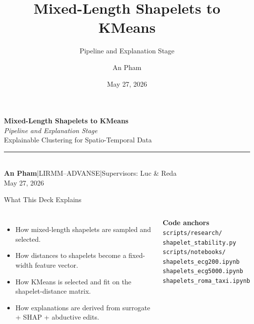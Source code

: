 \documentclass[aspectratio=169]{beamer}
\title{\textbf{Mixed-Length Shapelets to KMeans}}
\subtitle{Pipeline and Explanation Stage}
\author{An Pham}
\institute{LIRMM--ADVANSE, Universit\'e de Montpellier}
\date{May 27, 2026}
\begin{document}
{
\begin{frame}[plain]
\vspace{1.1cm}
{\color{white}\huge\bfseries Mixed-Length Shapelets to KMeans}\\[5pt]
{\color{cteal}\large\itshape Pipeline and Explanation Stage}\\[8pt]
{\color{caccent}\small Explainable Clustering for Spatio-Temporal Data}\\[0.6cm]
{\color{cmid}\rule{5.6cm}{0.8pt}}\\[5pt]
{\color{caccent}\footnotesize\textbf{An Pham}\quad|\quad LIRMM--ADVANSE\quad|\quad Supervisors: Luc \& Reda}\\[2pt]
{\color{caccent}\footnotesize May 27, 2026}
\end{frame}}

\begin{frame}{What This Deck Explains}
\begin{columns}[T,onlytextwidth]
  \begin{itemize}\footnotesize\setlength\itemsep{4pt}
    \item How mixed-length shapelets are sampled and selected.
    \item How distances to shapelets become a fixed-width feature vector.
    \item How KMeans is selected and fit on the shapelet-distance matrix.
    \item How explanations are derived from surrogate + SHAP + abductive edits.
  \end{itemize}
  \begin{tcolorbox}[enhanced,boxrule=1pt,arc=2pt,colback=clight,colframe=cmid]
    \footnotesize\textbf{Code anchors}\\[2pt]
    \tiny
    \texttt{scripts/research/}\\
    \texttt{shapelet\_stability.py}\\
    \texttt{scripts/notebooks/}\\
    \texttt{shapelets\_ecg200.ipynb}\\
    \texttt{shapelets\_ecg5000.ipynb}\\
    \texttt{shapelets\_roma\_taxi.ipynb}
  \end{tcolorbox}
\end{columns}
\end{frame}
\end{document}
